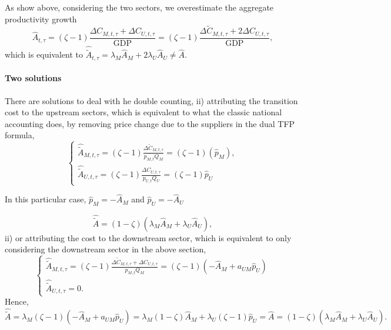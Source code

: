 \documentclass[11pt]{article}
\begin{document}



As show above, considering the two sectors, we overestimate the aggregate productivity growth
\begin{equation*}
\hat{A}_{t,\tau} =(\zeta - 1)  \frac{\Delta C_{M,t,\tau}+\Delta C_{U,t,\tau}}{\text{GDP}}=(\zeta - 1)  \frac{\Delta \tilde{C}_{M,t,\tau}+2\Delta C_{U,t,\tau}}{\text{GDP}},
\end{equation*}
which is equivalent to $\hat{\tilde{A}}_{t,\tau}= \lambda_M  \hat{A}_M +  2\lambda_U  \hat{A}_U\neq\hat{A}.$

\paragraph{Two solutions}

There are solutions to deal with he double counting, ii) attributing the transition cost to the upstream sectors, which is equivalent to what the classic national accounting does, by removing price change due to the suppliers in the dual TFP formula,
\begin{equation}
\begin{cases}
    \hat{\tilde{A}}_{M,t,\tau} = (\zeta - 1) \frac{\Delta \tilde{C}_{M,t,\tau}}{p_{M,t} Q_{M}}=(\zeta - 1)(\hat{p}_M),\\
    \hat{\tilde{A}}_{U,t,\tau}= (\zeta - 1) \frac{\Delta C_{U,t,\tau}}{p_{U,t} Q_{U}}=(\zeta - 1)\hat{p}_U
\end{cases}
\end{equation}

In this particular case, $\hat{p}_M=-\hat{A}_M$ and $\hat{p}_U=-\hat{A}_U$

\begin{equation*}
 \hat{\tilde{A}}=    (1-\zeta)\left(\lambda_M  \hat{A}_M+  \lambda_U  \hat{A}_U\right),
\end{equation*}
ii) or attributing the cost to the downstream sector, which is equivalent to only considering the downstream sector in the above section,
\begin{equation}
\begin{cases}
    \hat{\tilde{A}}_{M,t,\tau} = (\zeta - 1) \frac{\Delta \tilde{C}_{M,t,\tau}+\Delta C_{U,t,\tau}}{p_{M,t} Q_{M}}=(\zeta - 1)(-\hat{A}_M+a_{UM}  \hat{p}_U)\\
     \hat{\tilde{A}}_{U,t,\tau}=0.
\end{cases}
\end{equation}
Hence, 
\begin{equation*}
 \hat{\tilde{A}}=    \lambda_M  (\zeta - 1)(-\hat{A}_M+a_{UM}  \hat{p}_U)=\lambda_M  (1-\zeta )\hat{A}_M +  \lambda_U  (\zeta - 1)\hat{p}_U=\hat{A}= (1-\zeta)\left(\lambda_M  \hat{A}_M+  \lambda_U  \hat{A}_U\right).
\end{equation*}


\tiny
\renewcommand\bibname{References}


\normalsize
\end{document}
